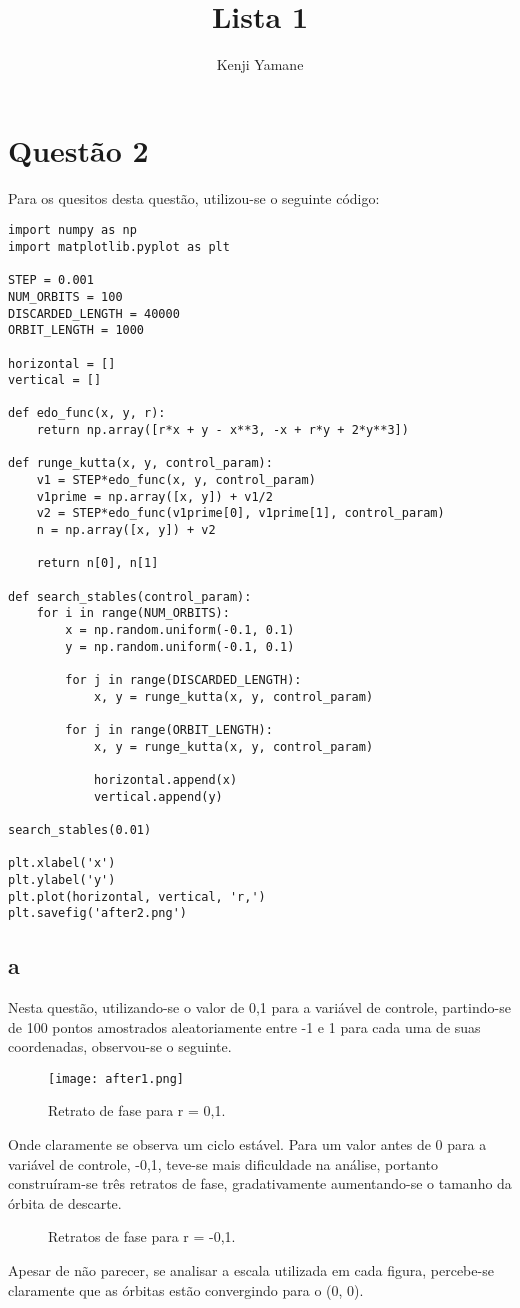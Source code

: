 \documentclass{article}[twocolumn]
\title{Lista 1}
\author{Kenji Yamane}
\begin{document}
	\maketitle
	\section{Quest\~ao 2}
	Para os quesitos desta quest\~ao, utilizou-se o seguinte c\'odigo:
	\begin{verbatim}
import numpy as np
import matplotlib.pyplot as plt

STEP = 0.001
NUM_ORBITS = 100
DISCARDED_LENGTH = 40000
ORBIT_LENGTH = 1000

horizontal = []
vertical = []

def edo_func(x, y, r):
	return np.array([r*x + y - x**3, -x + r*y + 2*y**3])

def runge_kutta(x, y, control_param):
	v1 = STEP*edo_func(x, y, control_param)
	v1prime = np.array([x, y]) + v1/2
	v2 = STEP*edo_func(v1prime[0], v1prime[1], control_param)
	n = np.array([x, y]) + v2
	
	return n[0], n[1]

def search_stables(control_param):
	for i in range(NUM_ORBITS):
		x = np.random.uniform(-0.1, 0.1)
		y = np.random.uniform(-0.1, 0.1)
		
		for j in range(DISCARDED_LENGTH):
			x, y = runge_kutta(x, y, control_param)
		
		for j in range(ORBIT_LENGTH):
			x, y = runge_kutta(x, y, control_param)
			
			horizontal.append(x)
			vertical.append(y)

search_stables(0.01)

plt.xlabel('x')
plt.ylabel('y')
plt.plot(horizontal, vertical, 'r,')
plt.savefig('after2.png')

	\end{verbatim}
	\subsection{a}
	Nesta quest\~ao, utilizando-se o valor de 0,1 para a vari\'avel de controle,
	partindo-se de 100 pontos amostrados aleatoriamente entre -1 e 1 para cada uma
	de suas coordenadas, observou-se o seguinte.
	\begin{figure}[H]
		\centering
		\texttt{[image: after1.png]}
		\caption{Retrato de fase para r = 0,1.}
	\end{figure}
	Onde claramente se observa um ciclo est\'avel.
	Para um valor antes de 0 para a vari\'avel de controle, -0,1, teve-se mais
	dificuldade na an\'alise, portanto constru\'iram-se tr\^es retratos de fase,
	gradativamente aumentando-se o tamanho da \'orbita de descarte.
	\begin{figure}[H]
		\centering
		\caption{Retratos de fase para r = -0,1.}
	\end{figure}
	Apesar de n\~ao parecer, se analisar a escala utilizada em cada figura, percebe-se
	claramente que as \'orbitas est\~ao convergindo para o (0, 0).
\end{document}
